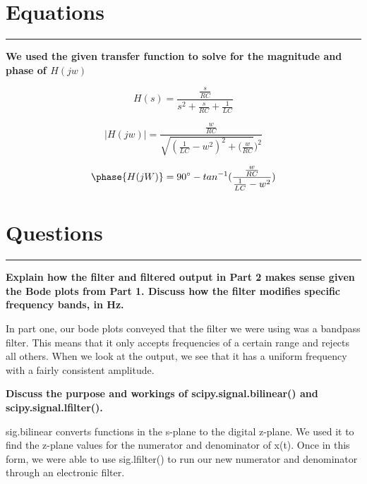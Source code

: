\documentclass[12pt]{report}
\begin{document}
\section*{Equations}
\hrule
\vspace{1cm}
\setlength{\parindent}{5ex}

\begin{center}
    \textbf{We used the given transfer function to solve for the magnitude and phase of $H(jw)$ }
\end{center} 
$$H(s) = \frac {\frac{s}{RC}} {s^{2} + \frac {s}{RC} + \frac{1}{LC}} $$
 
 \vspace{.5cm}
 
 $$|H(jw)|= \frac {\frac{w}{RC}} { \sqrt{(\frac{1}{LC}-w^{2})^{2}+(\frac{w}{RC}})^2 } $$
 
 \vspace{.5cm}
 
$$\phase{H(jW)} = 90^{\circ} - tan^{-1}(\frac{\frac{w}{RC}}{\frac{1}{LC}-w^2})$$
\section*{Questions}
\hrule
\vspace{1cm}
\setlength{\parindent}{5ex}
\textbf{Explain how the filter and filtered output in Part 2 makes sense given the Bode plots from Part 1. Discuss how the filter modifies specific frequency bands, in Hz.}\par

\vspace{.5cm}
In part one, our bode plots conveyed that the filter we were using was a bandpass filter. This means that it only accepts frequencies of a certain range and rejects all others. When we look at the output, we see that it has a uniform frequency with a fairly consistent amplitude. 
\vspace{.5cm}

\textbf{Discuss the purpose and workings of scipy.signal.bilinear() and scipy.signal.lfilter().}\par

\vspace{.5cm}
sig.bilinear converts functions in the s-plane to the digital z-plane. We used it to find the z-plane values for the numerator and denominator of x(t). Once in this form, we were able to use sig.lfilter() to run our new numerator and denominator through an electronic filter.\par 
\vspace{.5cm}
\end{document}
